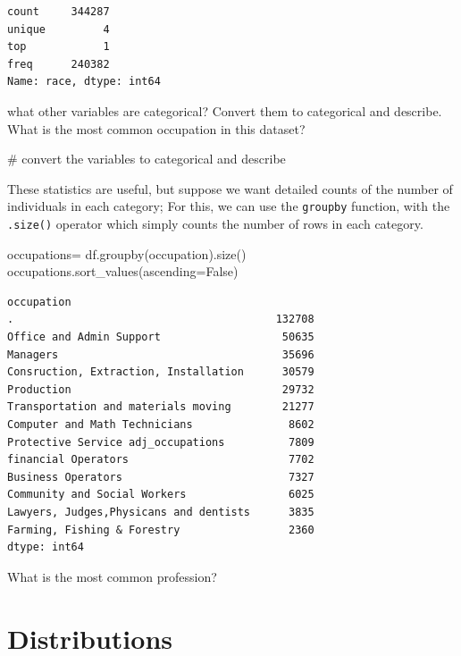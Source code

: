\documentclass[
  letterpaper,
  DIV=11,
  numbers=noendperiod]{scrreprt}
\newenvironment{Shaded}{\begin{snugshade}}{\end{snugshade}}
\newcommand{\CommentTok}[1]{\textcolor[rgb]{0.37,0.37,0.37}{#1}}
\newcommand{\NormalTok}[1]{\textcolor[rgb]{0.00,0.23,0.31}{#1}}
\newcommand{\OperatorTok}[1]{\textcolor[rgb]{0.37,0.37,0.37}{#1}}
\newcommand{\StringTok}[1]{\textcolor[rgb]{0.13,0.47,0.30}{#1}}
\newcommand{\VariableTok}[1]{\textcolor[rgb]{0.07,0.07,0.07}{#1}}
\begin{document}
\begin{verbatim}
count     344287
unique         4
top            1
freq      240382
Name: race, dtype: int64
\end{verbatim}

what other variables are categorical? Convert them to categorical and
describe. What is the most common occupation in this dataset?

\begin{Shaded}
\begin{Highlighting}[]
\CommentTok{\# convert the variables to categorical and describe}
\end{Highlighting}
\end{Shaded}

These statistics are useful, but suppose we want detailed counts of the
number of individuals in each category; For this, we can use the
\texttt{groupby} function, with the \texttt{.size()} operator which
simply counts the number of rows in each category.

\begin{Shaded}
\begin{Highlighting}[]
\NormalTok{occupations}\OperatorTok{=}\NormalTok{ df.groupby(}\StringTok{\textquotesingle{}occupation\textquotesingle{}}\NormalTok{).size()}
\NormalTok{occupations.sort\_values(ascending}\OperatorTok{=}\VariableTok{False}\NormalTok{)}
\end{Highlighting}
\end{Shaded}

\begin{verbatim}
occupation
.                                         132708
Office and Admin Support                   50635
Managers                                   35696
Consruction, Extraction, Installation      30579
Production                                 29732
Transportation and materials moving        21277
Computer and Math Technicians               8602
Protective Service adj_occupations          7809
financial Operators                         7702
Business Operators                          7327
Community and Social Workers                6025
Lawyers, Judges,Physicans and dentists      3835
Farming, Fishing & Forestry                 2360
dtype: int64
\end{verbatim}

What is the most common profession?


\hypertarget{distributions}{%
\chapter{Distributions}\label{distributions}}
\end{document}
